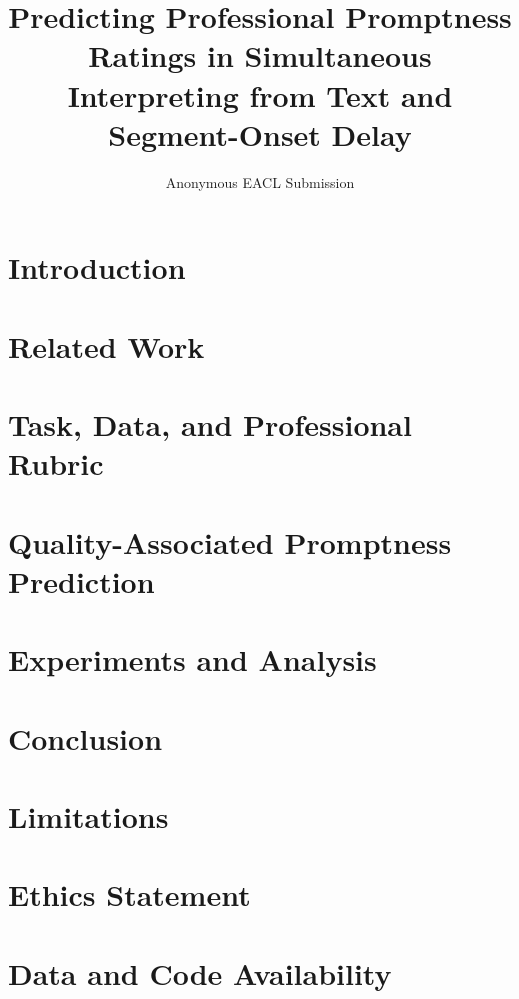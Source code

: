 \documentclass[11pt]{article}
\title{Predicting Professional Promptness Ratings in Simultaneous Interpreting from Text and Segment-Onset Delay}
\author{Anonymous EACL Submission}
\begin{document}
\maketitle

\begin{abstract}

\end{abstract}

\section{Introduction}

\section{Related Work}

\section{Task, Data, and Professional Rubric}

\section{Quality-Associated Promptness Prediction}

\section{Experiments and Analysis}

\section{Conclusion}


\clearpage
\section*{Limitations}

\section*{Ethics Statement}

\section*{Data and Code Availability}




\clearpage
\appendix


\end{document}
